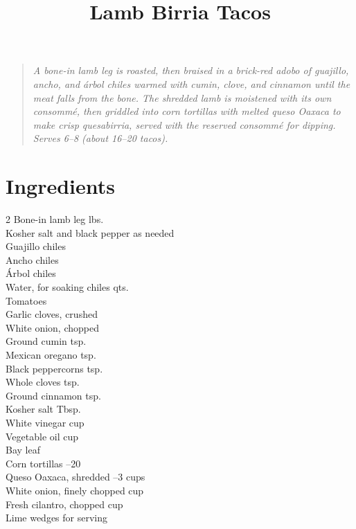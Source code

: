 \documentclass[11pt,letterpaper]{article}
\title{Lamb Birria Tacos}
\author{}
\date{}
\begin{document}
\maketitle
\thispagestyle{empty}

\begin{quote}\textit{A bone-in lamb leg is roasted, then braised in a brick-red adobo of guajillo, ancho, and árbol chiles warmed with cumin, clove, and cinnamon until the meat falls from the bone. The shredded lamb is moistened with its own consommé, then griddled into corn tortillas with melted queso Oaxaca to make crisp quesabirria, served with the reserved consommé for dipping. Serves 6--8 (about 16--20 tacos).}\end{quote}

\section*{Ingredients}
\setlength{\columnsep}{20pt}
\begin{multicols}{2}
\noindent
    Bone-in lamb leg  lbs. \\
    Kosher salt and black pepper \dotfill as needed \\
    Guajillo chiles  \\
    Ancho chiles  \\
    Árbol chiles  \\
    Water, for soaking chiles  qts. \\
    Tomatoes  \\
    Garlic cloves, crushed  \\
    White onion, chopped  \\
    Ground cumin  tsp. \\
    Mexican oregano  tsp. \\
    \columnbreak
    Black peppercorns  tsp. \\
    Whole cloves \dotfill {} tsp. \\
    Ground cinnamon \dotfill {} tsp. \\
    Kosher salt  Tbsp. \\
    White vinegar \dotfill {} cup \\
    Vegetable oil \dotfill {} cup \\
    Bay leaf  \\
    Corn tortillas --20 \\
    Queso Oaxaca, shredded --3 cups \\
    White onion, finely chopped  cup \\
    Fresh cilantro, chopped  cup \\
    Lime wedges \dotfill for serving \\
\end{multicols}
\end{document}
